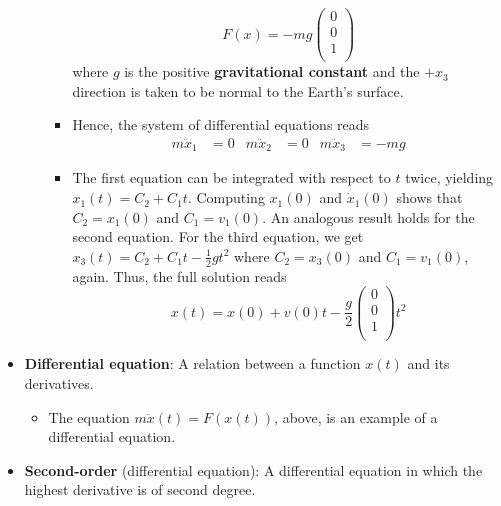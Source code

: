 \documentclass[../notes.tex]{subfiles}
\begin{document}
\begin{itemize}
\begin{itemize}
\begin{itemize}
            \begin{equation*}
                F(x) = -mg
                \begin{pmatrix}
                    0\\
                    0\\
                    1\\
                \end{pmatrix}
            \end{equation*}
            where $g$ is the positive \textbf{gravitational constant} and the $+x_3$ direction is taken to be normal to the Earth's surface.
            \item Hence, the system of differential equations reads
            \begin{align*}
                m\ddot{x}_1 &= 0&
                m\ddot{x}_2 &= 0&
                m\ddot{x}_3 &= -mg
            \end{align*}
            \item The first equation can be integrated with respect to $t$ twice, yielding $x_1(t)=C_2+C_1t$. Computing $x_1(0)$ and $\dot{x}_1(0)$ shows that $C_2=x_1(0)$ and $C_1=v_1(0)$. An analogous result holds for the second equation. For the third equation, we get $x_3(t)=C_2+C_1t-\frac{1}{2}gt^2$ where $C_2=x_3(0)$ and $C_1=v_1(0)$, again. Thus, the full solution reads
            \begin{equation*}
                x(t) = x(0)+v(0)t-\frac{g}{2}
                \begin{pmatrix}
                    0\\
                    0\\
                    1\\
                \end{pmatrix}
                t^2
            \end{equation*}
        \end{itemize}
    \end{itemize}
    \item \textbf{Differential equation}: A relation between a function $x(t)$ and its derivatives.
    \begin{itemize}
        \item The equation $m\ddot{x}(t)=F(x(t))$, above, is an example of a differential equation.
    \end{itemize}
    \item \textbf{Second-order} (differential equation): A differential equation in which the highest derivative is of second degree.

\end{itemize}
\end{document}

